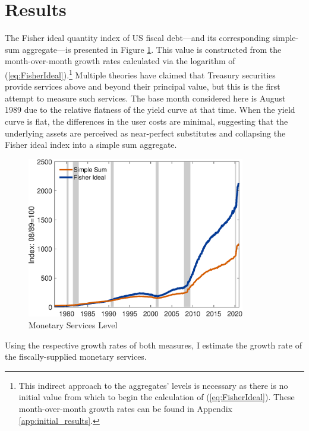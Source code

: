 \documentclass[11pt,a4paper,margin=1.5in]{article}
\begin{document}
\section{Results}
\label{sec:Results}


The Fisher ideal quantity index of US fiscal debt---and its corresponding simple-sum aggregate---is presented in Figure \ref{fig:MS_Index}.
This value is constructed from the month-over-month growth rates calculated via the logarithm of (\ref{eq:FisherIdeal}).\footnote{
	This indirect approach to the aggregates' levels is necessary as there is no initial value from which to begin the calculation of (\ref{eq:FisherIdeal}).
	These month-over-month growth rates can be found in Appendix \ref{app:initial_results}.
}
Multiple theories have claimed that Treasury securities provide services above and beyond their principal value, but this is the first attempt to measure such services. 
The base month considered here is August 1989 due to the relative flatness of the yield curve at that time.
When the yield curve is flat, the differences in the user costs are minimal, suggesting that the underlying assets are perceived as near-perfect substitutes and collapsing the Fisher ideal index into a simple sum aggregate. 
\begin{figure}[h]
	\centering
	\includegraphics[width=0.85\textwidth]{../Figures/FisherIndex_v2.eps}
	\caption{Monetary Services Level}
	\label{fig:MS_Index}
\end{figure}
Using the respective growth rates of both measures, I estimate the growth rate of the fiscally-supplied monetary services.
\end{document}

